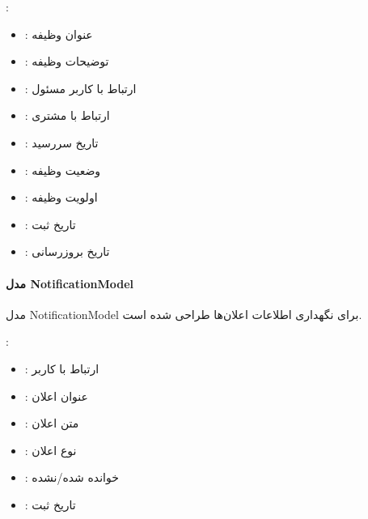 \documentclass[letterpaper,10pt,english]{sphinxmanual}
\begin{document}
\sphinxAtStartPar
{}:
\begin{itemize}
\item {} 
\sphinxAtStartPar
{}: عنوان وظیفه

\item {} 
\sphinxAtStartPar
{}: توضیحات وظیفه

\item {} 
\sphinxAtStartPar
{}: ارتباط با کاربر مسئول

\item {} 
\sphinxAtStartPar
{}: ارتباط با مشتری

\item {} 
\sphinxAtStartPar
{}: تاریخ سررسید

\item {} 
\sphinxAtStartPar
{}: وضعیت وظیفه

\item {} 
\sphinxAtStartPar
{}: اولویت وظیفه

\item {} 
\sphinxAtStartPar
{}: تاریخ ثبت

\item {} 
\sphinxAtStartPar
{}: تاریخ بروزرسانی

\end{itemize}


\paragraph{مدل NotificationModel}
\label{\detokenize{modules/core:notificationmodel}}
\sphinxAtStartPar
مدل NotificationModel برای نگهداری اطلاعات اعلان‌ها طراحی شده است.

\sphinxAtStartPar
{}:
\begin{itemize}
\item {} 
\sphinxAtStartPar
{}: ارتباط با کاربر

\item {} 
\sphinxAtStartPar
{}: عنوان اعلان

\item {} 
\sphinxAtStartPar
{}: متن اعلان

\item {} 
\sphinxAtStartPar
{}: نوع اعلان

\item {} 
\sphinxAtStartPar
{}: خوانده شده/نشده

\item {} 
\sphinxAtStartPar
{}: تاریخ ثبت

\end{itemize}
\end{document}
